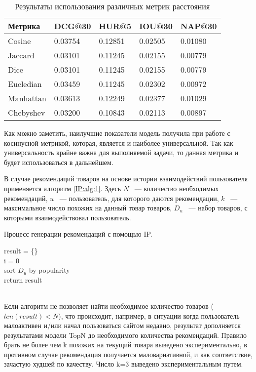 \documentclass[14pt]{mmcs_article}
\begin{document}
\begin{table}[H]
	\centering
	\caption{Результаты использования различных метрик расстояния}\label{IP:table:1}
\begin{tabular}{| l |l| l| l| l|}
	\hline
	Метрика & DCG@30 & HUR@5 & IOU@30 &  NAP@30 \\
	\hline
	Cosine & 0.03754 & 0.12851 & 0.02505 & 0.01080 \\
	\hline
	Jaccard &  0.03101 &0.11245 & 0.02155 & 0.00779\\
	\hline
	Dice & 0.03101 & 0.11245 & 0.02155 & 0.00779 \\
	\hline
	Eucledian & 0.03459 & 0.11245 & 0.02302 & 0.00972 \\
	\hline
	Manhattan & 0.03613 & 0.12249 & 0.02377 & 0.01029 \\
	\hline
	Chebyshev & 0.03200 & 0.10843 & 0.02113 & 0.00897 \\
	\hline
\end{tabular}
\end{table}
Как можно заметить, наилучшие показатели модель получила при работе с косинусной метрикой, которая, является и наиболее универсальной. Так как универсальность крайне важна для выполняемой задачи, то данная метрика и будет использоваться в дальнейшем.
 
В случае рекомендаций товаров на основе истории взаимодействий пользователя применяется алгоритм \ref{IP:alg:1}. Здесь $N$ ~--- количество необходимых рекомендаций, $u$ ~--- пользователь, для которого даются рекомендации, $k$ ~--- максимальное число похожих на данный товар товаров, $D_u$ ~--- набор товаров, с которыми взаимодействовал пользователь.   \\
\begin{algorithm}[H]\label{IP:alg:1}
	\caption{Процесс генерации рекомендаций с помощью IP.}
	result = \{\} \\
	i = 0 \\
	sort $D_u$ by popularity\\
	return result
\end{algorithm}  
\ \\

Если алгоритм не позволяет найти необходимое количество товаров ($len(result) < N$), что происходит, например, в ситуации когда пользователь малоактивен и/или начал пользоваться сайтом недавно, результат дополняется результатами модели TopN до необходимого количества рекомендаций. 
Правило брать не более чем k похожих на текущий товара выведено экспериментально, в противном случае рекомендация получается маловариативной, и как соответствие, зачастую худшей по качеству. Число k=3 выведено экспериментальным путем. 
\end{document}
